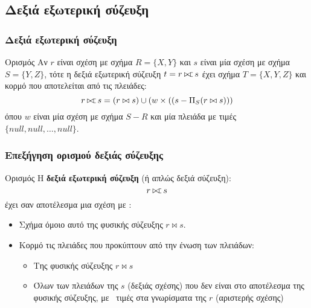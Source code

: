 \subsection[{\en leftjoin}]{\textgreek{Δεξιά εξωτερική σύζευξη}}

\begin{frame}
\frametitle{Δεξιά εξωτερική σύζευξη}
\begin{minipage}{\wE}
  \begin{block}{Ορισμός}
    Αν $r$ είναι σχέση με σχήμα $R=\{X,Y\}$
    και $s$ είναι μία σχέση
    με σχήμα $S=\{Y,Z\}$, τότε η δεξιά εξωτερική σύζευξη
    $t = r \rojoin s$ έχει σχήμα $T=\{X,Y,Z\}$ και κορμό
    που αποτελείται από τις πλειάδες:
    \[
      r \rojoin s = (r \bowtie s) \cup \left( w \times \left((s - \Pi_S (r \bowtie s)\right)\right)
    \]
    όπου $w$ είναι μία σχέση με σχήμα $S-R$ και μία πλειάδα με τιμές $\{null, null, \ldots, null\}$.
  \end{block}
\end{minipage}
\end{frame}


\begin{frame}
\frametitle{Επεξήγηση ορισμού δεξιάς σύζευξης}
\begin{minipage}{\wE}
  \begin{block}{Ορισμός}
    Η {\bf δεξιά εξωτερική σύζευξη} (ή απλώς δεξιά σύζευξη):
    \[ r \rojoin s \]
    έχει σαν αποτέλεσμα μια σχέση με :
    \begin{itemize}
      \item Σχήμα όμοιο αυτό της φυσικής σύζευξης $r \bowtie s$.
      \item Κορμό τις πλειάδες που προκύπτουν από την ένωση των πλειάδων:
      \begin{itemize}
        \item Της φυσικής σύζευξης $r \bowtie s$
        \item Όλων των πλειάδων της $s$ (δεξιάς σχέσης) που δεν είναι στο
              αποτέλεσμα της φυσικής σύζευξης,
              με \tnull\ τιμές στα γνωρίσματα της $r$ (αριστερής σχέσης)
      \end{itemize}
    \end{itemize}
  \end{block}
\end{minipage}
\end{frame}


